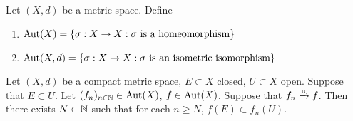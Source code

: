\documentclass{book}
\begin{document}
\begin{defn} \ld{}
	Let $(X, d)$ be a metric space. Define
	\begin{enumerate}
		\item $\operatorname{Aut}(X) = \{\sigma:X \rightarrow X: \sigma \text{ is a homeomorphism}\}$
		\item $\operatorname{Aut}(X, d) = \{\sigma:X \rightarrow X: \sigma \text{ is an isometric isomorphism}\}$
	\end{enumerate}
\end{defn}

\begin{ex} \lex{}
	Let $(X, d)$ be a compact metric space, $E \subset X$ closed, $U \subset X$ open. Suppose that $E \subset U$. Let $(f_n)_{n \in \mathbb{N}} \in \operatorname{Aut}(X)$, $f \in \operatorname{Aut}(X)$.  Suppose that $f_n \xrightarrow{\text{u}} f$. Then there exists $N \in \mathbb{N}$ such that for each $n \geq N$, $f(E) \subset f_n(U)$.
\end{ex}
\end{document}

